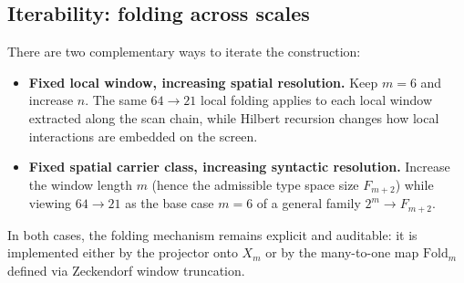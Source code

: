 \subsection{Iterability: folding across scales}
There are two complementary ways to iterate the construction:
\begin{itemize}
\item \textbf{Fixed local window, increasing spatial resolution.}
Keep $m=6$ and increase $n$. The same $64\to 21$ local folding applies to each local window extracted along the scan chain, while Hilbert recursion changes how local interactions are embedded on the screen.
\item \textbf{Fixed spatial carrier class, increasing syntactic resolution.}
Increase the window length $m$ (hence the admissible type space size $F_{m+2}$) while viewing $64\to 21$ as the base case $m=6$ of a general family $2^m\to F_{m+2}$.
\end{itemize}
In both cases, the folding mechanism remains explicit and auditable: it is implemented either by the projector onto $X_m$ or by the many-to-one map $\mathrm{Fold}_m$ defined via Zeckendorf window truncation.


